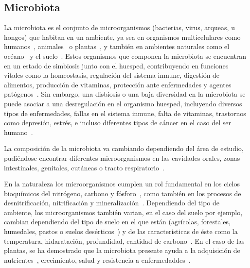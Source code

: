\subsection{Microbiota}
La microbiota es el conjunto de microorganismos (bacterias, virus, arqueas, u hongos) que habitan en un ambiente, ya sea en organismos multicelulares como humanos~\cite{gilbert2018current}, animales~\cite{bahrndorff2016microbiome} o plantas~\cite{berendsen2012rhizosphere}, y también en ambientes naturales como el océano~\cite{doi:10.1126/science.aac8455} y el suelo~\cite{banerjee2023soil}. 
Estos organismos que componen la microbiota se encuentran en un estado de simbiosis junto con el huesped, contribuyendo en funciones vitales como la homeostasis, regulación del sistema inmune, digestión de alimentos, producción de vitaminas, protección ante enfermedades y agentes patógenos~\cite{marco2021defining,fijan2014microorganisms,altvecs2020interaction,hou2022microbiota}. 
Sin embargo, una disbiosis o una baja diversidad en la microbiota se puede asociar a una desregulación en el organismo huesped, incluyendo diversos tipos de enfermedades, fallas en el sistema inmune, falta de vitaminas, trastornos como depresión, estrés, e incluso diferentes tipos de cáncer en el caso del ser humano~\cite{altvecs2020interaction,hou2022microbiota}.

La composición de la microbiota va cambiando dependiendo del área de estudio, pudiéndose encontrar diferentes microorganismos en las cavidades orales, zonas intestinales, genitales, cutáneas o tracto respiratorio~\cite{ursell2012interpersonal}.


En la naturaleza los microorganismos cumplen un rol fundamental en los ciclos bioquímicos del nitrógeno, carbono y fósforo~\cite{bitton1994role, gougoulias2014role}, como también en los procesos de desnitrificación, nitrificación y mineralización~\cite{bitton1994role, gougoulias2014role}. 
Dependiendo del tipo de ambiente, los microorganismos también varian, en el caso del suelo por ejemplo, cambian dependiendo del tipo de suelo en el que están (agrícolas, forestales, humedales, pastos o suelos desérticos~\cite{jiao2021linking}) y de las características de éste como la temperatura, hidaratación, profundidad, cantidad de carbono~\cite{bickel2020soil}.
En el caso de las plantas, se ha demostrado que la microbiota presente ayuda a la adquisición de nutrientes~\cite{hu2017probiotic}, crecimiento, salud y resistencia a enfermedaddes~\cite{lemanceau2017let,hardoim2015hidden,vorholt2012microbial,COMPANT201929}.


